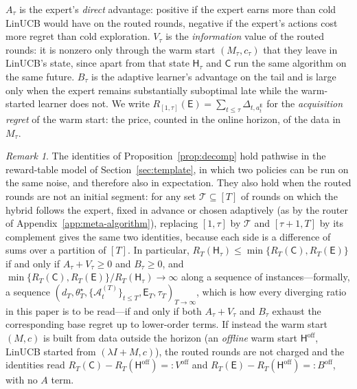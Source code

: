 \documentclass{article}
\theoremstyle{definition}
\theoremstyle{remark}
\newtheorem{remark}{Remark}
\theoremstyle{remark}
\newcommand{\Cold}{\mathsf{C}}
\newcommand{\Exp}{\mathsf{E}}
\newcommand{\Hyb}{\mathsf{H}}
\begin{document}
$A_\tau$ is the expert's \emph{direct} advantage: positive if the expert earns
more than cold LinUCB would have on the routed rounds, negative if the expert's
actions cost more regret than cold exploration. $V_\tau$ is the
\emph{information} value of the routed rounds: it is nonzero only through the
warm start $(M_\tau,c_\tau)$ that they leave in LinUCB's state, since apart
from that state $\Hyb_\tau$ and $\Cold$ run the same algorithm on the same
future. $B_\tau$ is the adaptive learner's advantage on the tail and is large
only when the expert remains substantially suboptimal late while the
warm-started learner does not. We write $R_{[1,\tau]}(\Exp)=\sum_{t\le\tau}\Delta_{t,a_t^{\Exp}}$
for the \emph{acquisition regret} of the warm start: the price, counted in the
online horizon, of the data in $M_\tau$.

\begin{remark}
The identities of Proposition~\ref{prop:decomp} hold pathwise in the
reward-table model of Section~\ref{sec:template}, in which two policies can
be run on the same noise, and therefore also in expectation. They also hold
when the routed rounds are not an initial segment: for any set
$\mathcal T\subseteq[T]$ of rounds on which the hybrid follows the expert,
fixed in advance or chosen adaptively (as by the router of
Appendix~\ref{app:meta-algorithm}), replacing $[1,\tau]$ by $\mathcal T$ and
$[\tau+1,T]$ by its complement gives the same two identities, because each
side is a difference of sums over a partition of $[T]$. In particular,
$R_T(\Hyb_\tau)\le\min\{R_T(\Cold),R_T(\Exp)\}$ if and only if
$A_\tau+V_\tau\ge0$ and $B_\tau\ge0$, and
$\min\{R_T(\Cold),R_T(\Exp)\}/R_T(\Hyb_\tau)\to\infty$ along a sequence of
instances---formally, a sequence
$(d_T,\theta^\star_T,\{\mathcal A^{(T)}_t\}_{t\le T},\Exp_T,\tau_T)_{T\to\infty}$,
which is how every diverging ratio in this paper is to be read---if and only
if both $A_\tau+V_\tau$ and $B_\tau$ exhaust the corresponding base regret up
to lower-order terms. If instead the warm start
$(M,c)$ is built from data outside the horizon (an \emph{offline} warm start
$\Hyb^{\mathrm{off}}$, LinUCB started from $(\lambda I+M,c)$), the routed
rounds are not charged and the identities read
$R_T(\Cold)-R_T(\Hyb^{\mathrm{off}})=:V^{\mathrm{off}}$ and
$R_T(\Exp)-R_T(\Hyb^{\mathrm{off}})=:B^{\mathrm{off}}$, with no $A$ term.
\end{remark}
\end{document}
